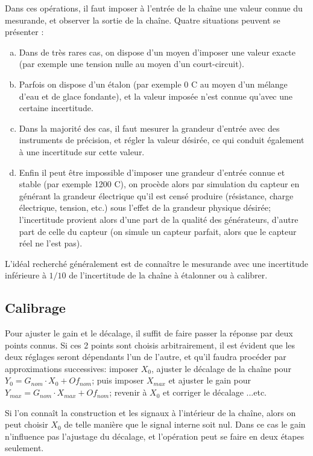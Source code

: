 Dans ces opérations, il faut imposer à l'entrée de la chaîne une valeur connue du mesurande, et observer la sortie de la chaîne. Quatre situations peuvent se présenter :
\begin{enumerate}[a)]
\item Dans de très rares cas, on dispose d'un moyen d'imposer une valeur exacte (par exemple une tension nulle au moyen d'un court-circuit).
\item Parfois on dispose d'un étalon (par exemple 0 \degree C au moyen d'un mélange d'eau et de glace fondante), et la valeur imposée n'est connue qu'avec une certaine incertitude.
\item Dans la majorité des cas, il faut mesurer la grandeur d'entrée avec des instruments de précision, et  régler la valeur désirée, ce qui conduit également à une incertitude sur cette valeur.
\item Enfin il peut être impossible d'imposer une grandeur d'entrée connue et stable (par exemple 1200 \degree C), on procède alors par simulation du capteur en générant la grandeur électrique qu'il est censé produire (résistance, charge électrique, tension, etc.) sous l'effet de la grandeur physique désirée; l'incertitude provient alors d'une part de la qualité des générateurs, d'autre part de celle du capteur (on simule un capteur parfait, alors que le capteur réel ne l'est pas).
\end{enumerate}
L'idéal recherché généralement est de connaître le mesurande avec une incertitude inférieure à $1/10$ de l'incertitude de la chaîne à étalonner ou à calibrer.

\subsection{Calibrage}

Pour ajuster le gain et le décalage, il suffit de faire passer la réponse par deux points connus. Si ces 2 points sont choisis arbitrairement, il est évident que les deux réglages seront dépendants l'un de l'autre, et qu'il faudra procéder par approximations successives: imposer $X_{0}$, ajuster le décalage de la chaîne pour $Y_{0} = G_{nom} \cdot X_{0} + Of_{nom}$; puis imposer $X_{max}$ et ajuster le gain pour $Y_{max} = G_{nom} \cdot X_{max} + Of_{nom}$; revenir à $X_{0}$ et corriger le décalage ...etc.

Si l'on connaît la construction et les signaux à l'intérieur de la chaîne, alors on peut choisir $X_{0}$ de telle manière que le signal interne soit nul. Dans ce cas le gain n'influence pas l'ajustage du décalage, et l'opération peut se faire en deux étapes seulement.


